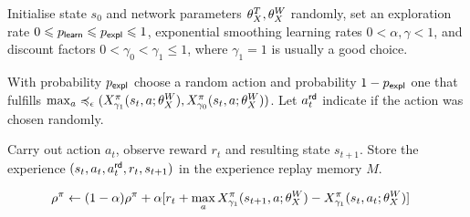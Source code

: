 \documentclass[envcountsame]{llncs}
\begin{document}
\begin{algorithm}[t!]
  \begin{algorithmic}[1]
    \State{}Initialise state \(s_{0}\) and network parameters \(\theta_X^{T}, \theta_X^{W}\) randomly, set
    an exploration rate \(0 \leqslant p_{\mathsf{learn}} \leqslant p_{\mathsf{expl}} \leqslant 1\), exponential smoothing learning rates
    \(0 < \alpha, \gamma < 1\), and discount factors
    \(0 < \gamma_{0} < \gamma_{1} \leqslant 1\), where \(\gamma_{1} = 1\) is
    usually a good choice.
    \State{}\begin{minipage}[t]{\dimexpr\textwidth-\leftmargin-\labelsep-\labelwidth}
      With probability \(p_{\mathsf{expl}}\) choose a random action and
      probability \(1-p_{\mathsf{expl}}\) one that fulfills
      \(\max_{a}\preccurlyeq_{\epsilon}(X^{\pi}_{\gamma_{1}}(s_{t},a; \theta_X^{W}{}),X^\pi_ {\gamma_{0}}(s_{t},a; \theta_X^{W}{}))\). Let
      \(a_{t}^{\mathsf{rd}}\) indicate if the action was chosen randomly.
    \end{minipage}
    \State{}\begin{minipage}[t]{\dimexpr\textwidth-\leftmargin-\labelsep-\labelwidth}
    Carry out action \(a_{t}\), observe reward \(r_{t}\) and resulting state \(s_{t+1}\).
    Store the experience \((s_{t}, a_{t}, a_{t}^{\mathsf{rd}}, r_{t}, s_{t+1})\) in the experience replay
    memory \(M\).
    \end{minipage}
    \begin{align*}
      \rho^{\pi}  & \gets (1- \alpha) \rho^{\pi} + \alpha [r_{t} +
      \max_{a}X^\pi_{\gamma_1}(s_{t+1},a; \theta_X^{W}{}) - X^\pi_{\gamma_1}(s_{t},a_{t};
                        \theta_X^{W}{})]
    \end{align*}
    \EndIf


\end{algorithmic}
\end{algorithm}
\end{document}
